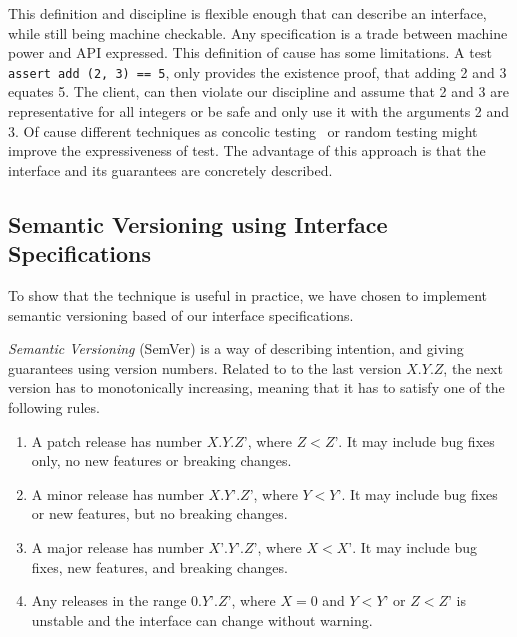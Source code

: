 This definition and discipline is flexible enough that can describe an
interface, while still being machine checkable. Any specification is a trade
between machine power and API expressed. This definition of cause has some
limitations. A test \texttt{assert add (2, 3) == 5}, only provides the existence proof,
that adding 2 and 3 equates 5. The client, can then violate our discipline and
assume that 2 and 3 are representative for all integers or be safe and only use
it with the arguments 2 and 3. Of cause different techniques as concolic
testing~\cite{sen05-cute} or random testing might improve the expressiveness of test. The
advantage of this approach is that the interface and its guarantees are
concretely described. 

\subsection{Semantic Versioning using Interface Specifications}

To show that the technique is useful in practice, we have chosen to implement
semantic versioning based of our interface specifications.

\begin{definition}\textit{Semantic Versioning} (SemVer) is a way of describing
intention, and giving guarantees using version numbers\cite{semver}.
Related to to the last version $X.Y.Z$, the next version has to
monotonically increasing, meaning that it has to satisfy one of the
following rules.

\begin{enumerate}
    \item A patch release has number $X.Y.Z’$, where $Z < Z’$. It may include
    bug fixes only, no new features or breaking changes.
    
    \item A minor release has number $X.Y’.Z’$, where $Y < Y’$. It may include
    bug fixes or new features, but no breaking changes.
    
    \item A major release has number $X’.Y’.Z’$, where $X < X’$. It may include
    bug fixes, new features, and breaking changes.
    
    \item Any releases in the range $0.Y’.Z’$, where $X = 0$ and $Y < Y’$ or $Z
    < Z’$ is unstable and the interface can change without warning.
\end{enumerate}

\end{definition}

